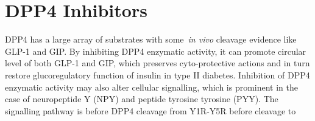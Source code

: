 \section{DPP4 Inhibitors}
DPP4 has a large array of substrates with some~\textit{in vivo} cleavage evidence like GLP-1 and GIP. By inhibiting DPP4 enzymatic activity, it can promote circular level of both GLP-1 and GIP, which preserves cyto-protective actions and in turn restore glucoregulatory function of insulin in type II diabetes. Inhibition of DPP4 enzymatic activity may also alter cellular signalling, which is prominent in the case of neuropeptide Y (NPY) and peptide tyrosine tyrosine (PYY). The signalling pathway is before DPP4 cleavage from Y1R-Y5R before cleavage to 